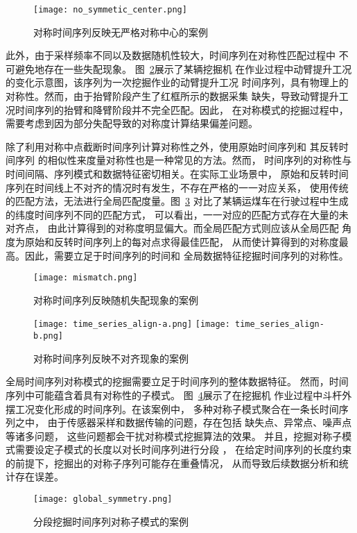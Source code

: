 \begin{figure}
  \centering
  \texttt{[image: no\_symmetic\_center.png]}
  \caption{对称时间序列反映无严格对称中心的案例}
  \label{fig:no_symmetic_center}
\end{figure}

此外，由于采样频率不同以及数据随机性较大，时间序列在对称性匹配过程中
不可避免地存在一些失配现象\cite{DBLP:journals/corr/abs-2202-05403}。
图~\ref{fig:mismatch}展示了某辆挖掘机
在作业过程中动臂提升工况的变化示意图，该序列为一次挖掘作业的动臂提升工况
时间序列，具有物理上的对称性。然而，由于抬臂阶段产生了红框所示的数据采集
缺失，导致动臂提升工况时间序列的抬臂和降臂阶段并不完全匹配。因此，
在对称模式的挖掘过程中，需要考虑到因为部分失配导致的对称度计算结果偏差问题。

除了利用对称中点截断时间序列计算对称性之外，使用原始时间序列和
其反转时间序列\cite{DBLP:journals/entropy/ChvostekovaJK21}
的相似性来度量对称性也是一种常见的方法。然而，
时间序列的对称性与时间间隔、序列模式和数据特征密切相关。在实际工业场景中，
原始和反转时间序列在时间线上不对齐的情况时有发生，不存在严格的一一对应关系，
使用传统的匹配方法，无法进行全局匹配度量。图~\ref{fig:time_series_align}
对比了某辆运煤车在行驶过程中生成的纬度时间序列不同的匹配方式，
可以看出，一一对应的匹配方式存在大量的未对齐点，
由此计算得到的对称度明显偏大。而全局匹配方式则应该从全局匹配
角度为原始和反转时间序列上的每对点求得最佳匹配，
从而使计算得到的对称度最高。因此，需要立足于时间序列的时间和
全局数据特征挖掘时间序列的对称性。
\begin{figure}
  \centering
  \texttt{[image: mismatch.png]}
  \caption{对称时间序列反映随机失配现象的案例}
  \label{fig:mismatch}
\end{figure}
\begin{figure}
  \centering
    {\texttt{[image: time\_series\_align-a.png]}}
    {\texttt{[image: time\_series\_align-b.png]}}
  \caption{对称时间序列反映不对齐现象的案例}
  \label{fig:time_series_align}
\end{figure}

全局时间序列对称模式的挖掘需要立足于时间序列的整体数据特征。
然而，时间序列中可能蕴含着具有对称性的子模式。
图~\ref{fig:segement_symmetric_pattern}展示了在挖掘机
作业过程中斗杆外摆工况变化形成的时间序列。在该案例中，
多种对称子模式聚合在一条长时间序列之中，
由于传感器采样和数据传输的问题，存在包括
缺失点、异常点、噪声点等诸多问题\cite{DBLP:conf/sigmod/SongZWY15}，
这些问题都会干扰对称模式挖掘算法的效果。
并且，挖掘对称子模式需要设定子模式的长度以对长时间序列进行分段
\cite{DBLP:journals/tist/MuralidharTCCRP20}，
在给定时间序列的长度约束的前提下，挖掘出的对称子序列可能存在重叠情况，
从而导致后续数据分析和统计存在误差。
\begin{figure}
  \centering
  \texttt{[image: global\_symmetry.png]}
  \caption{分段挖掘时间序列对称子模式的案例}
  \label{fig:segement_symmetric_pattern}
\end{figure}


